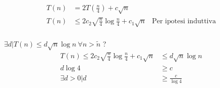 \begin{enumerate}[label=\alph*)]
	\begin{align*}
		T(n) &= 2T \left( \frac{n}{4} \right) + c\sqrt{n}  \\
		T(n) &\leq 2c_2\sqrt{\frac{n}{4}} \log \frac{n}{4} + c_1\sqrt{n}  & \text{Per ipotesi induttiva} \\
	\end{align*}
	
	\( \exists d | T(n) \leq d \sqrt{n} \log n \ \forall n > \tilde{n} \) ? \\
	
	\begin{align*}
		T(n) \leq 2c_2\sqrt{\frac{n}{4}} \log \frac{n}{4} + c_1\sqrt{n} &\leq d \sqrt{n} \log n \\
		d \log 4 &\geq c \\
		\exists d > 0 | d &\geq \frac{c}{\log 4} \\
	\end{align*}

\end{enumerate}
